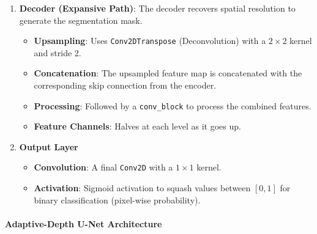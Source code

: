 \begin{enumerate}
    \item \textbf{Decoder (Expansive Path)}: The decoder recovers spatial resolution to generate the segmentation mask.
    \begin{itemize}
        \item \textbf{Upsampling}: Uses \texttt{Conv2DTranspose} (Deconvolution) with a $2 \times 2$ kernel and stride 2.
        \item \textbf{Concatenation}: The upsampled feature map is concatenated with the corresponding skip connection from the encoder.
        \item \textbf{Processing}: Followed by a \texttt{conv\_block} to process the combined features.
        \item \textbf{Feature Channels}: Halves at each level as it goes up.
    \end{itemize}

    \item \textbf{Output Layer}
    \begin{itemize}
        \item \textbf{Convolution}: A final \texttt{Conv2D} with a $1 \times 1$ kernel.
        \item \textbf{Activation}: Sigmoid activation to squash values between $[0, 1]$ for binary classification (pixel-wise probability).
    \end{itemize}
\end{enumerate}


\paragraph{Adaptive-Depth U-Net Architecture}


